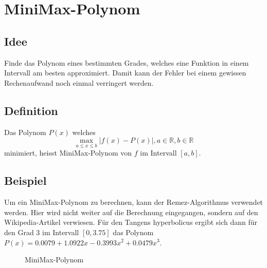 %
%
%
\section{MiniMax-Polynom 
\label{transfer:section:teil3}}

\subsection{Idee
\label{transfer:subsection:idee}}
Finde das Polynom eines bestimmten Grades, welches eine Funktion
in einem Intervall am besten approximiert. Damit kann der Fehler
bei einem gewissen Rechenaufwand noch einmal verringert werden.

\subsection{Definition
\label{transfer:subsection:definition}}
Das Polynom $P(x)$ welches 
\[
\max _{a \leq x \leq b}|f(x)-P(x)| , a \in \mathbb{R}, b \in \mathbb{R}
\]
minimiert, heisst MiniMax-Polynom von $f$ im Intervall $[a,b]$.
%

\subsection{Beispiel
\label{transfer:subsection:beispiel}}
Um ein MiniMax-Polynom zu berechnen, kann der Remez-Algorithmus
verwendet werden. Hier wird nicht weiter auf die Berechnung
eingegangen, sondern auf den Wikipedia-Artikel \cite{transfer:remez}
verwiesen.
Für den Tangens hyperbolicus ergibt sich dann für den
Grad 3 im Intervall $[0,3.75]$ das Polynom $P(x)=0.0079+1.0922
x-0.3993 x^{2}+0.0479 x^{3}$.


\begin{figure}
	\centering
	\caption{MiniMax-Polynom
		\label{motivation:figure:Minimax3}}
\end{figure}

